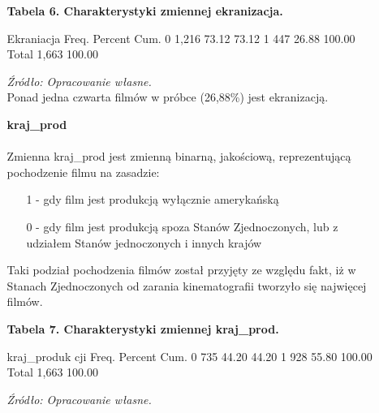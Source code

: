 \begin{itemize}
\begin{itemize}
{\centering
\textbf{Tabela 6. Charakterystyki zmiennej ekranizacja.}}
\begin{stlog}	

 Ekraniacja {\VBAR}      Freq.     Percent        Cum.
          0 {\VBAR}      1,216       73.12       73.12
          1 {\VBAR}        447       26.88      100.00
      Total {\VBAR}      1,663      100.00
{\smallskip}

\end{stlog}

\textit{\footnotesize{Źródło: Opracowanie własne.}} \\
	
	Ponad jedna czwarta filmów w próbce (26,88\%) jest ekranizacją. 
	
	\vspace{0.3cm}
	
	\item[\ding{228}]\textbf{kraj_prod} \\
	\\Zmienna kraj_prod jest zmienną binarną, jakościową, reprezentującą pochodzenie filmu na zasadzie:
	\begin{itemize}
	
	\item[1] - gdy film jest produkcją wyłącznie amerykańską
	\item[0] - gdy film jest produkcją spoza Stanów Zjednoczonych, lub z udziałem Stanów jednoczonych i innych krajów
	
	\end{itemize}
	Taki podział pochodzenia filmów został przyjęty ze względu fakt, iż w Stanach Zjednoczonych od zarania kinematografii tworzyło się najwięcej filmów. 
	
		 \vspace{0.5cm}
	
{\centering
\textbf{Tabela 7. Charakterystyki zmiennej kraj_prod.}}
\begin{stlog}	

kraj_produk {\VBAR}
        cji {\VBAR}      Freq.     Percent        Cum.
          0 {\VBAR}        735       44.20       44.20
          1 {\VBAR}        928       55.80      100.00
      Total {\VBAR}      1,663      100.00
{\smallskip}

\end{stlog}

\textit{\footnotesize{Źródło: Opracowanie własne.}} \\


\end{itemize}
\end{itemize}
